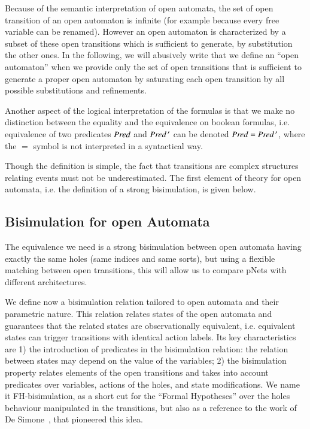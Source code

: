 \documentclass{elsarticle}
\newcommand{\LUDO}[1]{\textcolor{darkgreen}{#1}}
\begin{document}
Because of the semantic interpretation of open automata, the set of open transition of an open automaton is infinite (for example because every free variable can be renamed). However an open automaton is characterized by a  subset of these open transitions which is sufficient to generate, by substitution the other ones. In the following, we will abusively write that we define an ``open automaton'' when we provide only the set of open transitions that is sufficient to generate a proper open automaton by saturating each open transition by all possible substitutions and refinements.

Another aspect of the logical interpretation of the
formulas is that we make no distinction between the equality and the
equivalence on boolean formulas, i.e. equivalence of two predicates
$\Pred$ and $\Pred\,'$ can be denoted $\Pred=\Pred\,'$, where the $=$ symbol is not interpreted in a syntactical way.

	
Though the definition is simple, the fact that transitions are complex structures relating events must not be underestimated. The first element of theory for open automata, i.e. the definition of a strong bisimulation, is given below.


\subsection{Bisimulation for open Automata}
\label{section:bisimulation}


The equivalence we need is a strong bisimulation between
open automata having exactly the same holes (same indices and same sorts), but using a
flexible matching 
between open transitions, this will allow us to compare pNets
with different architectures.

We define now a bisimulation relation tailored to open automata and their parametric nature. This relation relates states of the open automata and guarantees that the related states are observationally equivalent, i.e. equivalent states can trigger transitions with identical action labels. Its key characteristics are 1) the introduction of predicates in the bisimulation relation: the relation between states may depend on the value of the variables; 2) the bisimulation property relates elements of the open transitions and takes into account predicates over variables, actions of the holes, and state modifications.
 We name it FH-bisimulation,
 as a short cut for the ``Formal Hypotheses'' over the holes behaviour manipulated in the
 transitions, but also as a reference to the work of De Simone~\cite{deSimone85},
 that pioneered this idea.
\end{document}
